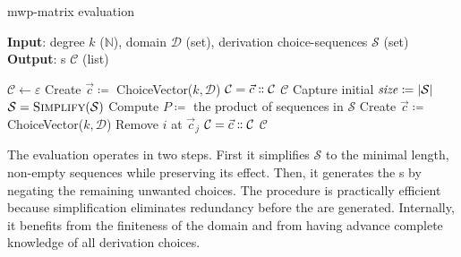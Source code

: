 \begin{algorithm}
    \caption{mwp-matrix evaluation}
    \label{alg:algo}
    \textbf{Input}:
    degree \(k\) (\(\mathbb{N}\)),
    domain \(\mathcal{D}\) (set),
    derivation choice-sequences \(\mathcal{S}\) (set)\\
    \textbf{Output}: s \(\mathcal{C}\) (list)
    \begin{algorithmic}[1]
        \State \(\mathcal{C} \gets \varepsilon \)
        \label{alg:step0}
            \State Create \(\vec{c} \coloneqq\) ChoiceVector(\(k, \mathcal{D}\))
            \State \(\mathcal{C} \gets \vec{c} \dblcolon\mathcal{C} \)
        \EndIf
        \State \Return \(\mathcal{C}\)\label{alg:step0end}
        \EndIf
        \Do \; Capture initial \(\text{\textit{size}} \coloneqq |\mathcal{S}|\)
        \State \(\mathcal{S} \gets \textsc{Simplify}(\mathcal{S})\)\label{alg:step1}
        \State Compute \(P \coloneqq\) the product of sequences in \(\mathcal{S}\)\label{alg:step2}
         
        \State Create \(\vec{c} \coloneqq\) ChoiceVector(\(k, \mathcal{D}\))
          
        \State Remove \(i\) at \(\vec{c}_j\)
        \EndFor
            \State \(\mathcal{C} \gets \vec{c} \dblcolon\mathcal{C} \)\label{alg:add}\label{alg:step2end}
        \EndIf
        \EndFor
        \State \Return \(\mathcal{C}\)
    \end{algorithmic}
\end{algorithm}

The evaluation operates in two steps.
First it simplifies \(\mathcal{S}\) to the minimal length, non-empty sequences while preserving its effect.
Then, it generates the s by negating the remaining unwanted choices.
The procedure is practically efficient because simplification eliminates redundancy before the  are generated.
Internally, it benefits from the finiteness of the domain and from having advance complete knowledge of all derivation choices.

